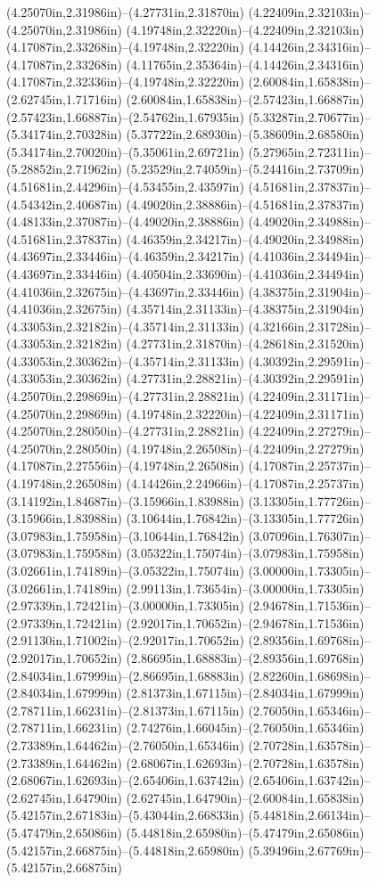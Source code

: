 (4.25070in,2.31986in)--(4.27731in,2.31870in) (4.22409in,2.32103in)--(4.25070in,2.31986in) (4.19748in,2.32220in)--(4.22409in,2.32103in) (4.17087in,2.33268in)--(4.19748in,2.32220in) (4.14426in,2.34316in)--(4.17087in,2.33268in) (4.11765in,2.35364in)--(4.14426in,2.34316in) (4.17087in,2.32336in)--(4.19748in,2.32220in) (2.60084in,1.65838in)--(2.62745in,1.71716in) (2.60084in,1.65838in)--(2.57423in,1.66887in) (2.57423in,1.66887in)--(2.54762in,1.67935in) (5.33287in,2.70677in)--(5.34174in,2.70328in) (5.37722in,2.68930in)--(5.38609in,2.68580in) (5.34174in,2.70020in)--(5.35061in,2.69721in) (5.27965in,2.72311in)--(5.28852in,2.71962in) (5.23529in,2.74059in)--(5.24416in,2.73709in) (4.51681in,2.44296in)--(4.53455in,2.43597in) (4.51681in,2.37837in)--(4.54342in,2.40687in) (4.49020in,2.38886in)--(4.51681in,2.37837in) (4.48133in,2.37087in)--(4.49020in,2.38886in) (4.49020in,2.34988in)--(4.51681in,2.37837in) (4.46359in,2.34217in)--(4.49020in,2.34988in) (4.43697in,2.33446in)--(4.46359in,2.34217in) (4.41036in,2.34494in)--(4.43697in,2.33446in) (4.40504in,2.33690in)--(4.41036in,2.34494in) (4.41036in,2.32675in)--(4.43697in,2.33446in) (4.38375in,2.31904in)--(4.41036in,2.32675in) (4.35714in,2.31133in)--(4.38375in,2.31904in) (4.33053in,2.32182in)--(4.35714in,2.31133in) (4.32166in,2.31728in)--(4.33053in,2.32182in) (4.27731in,2.31870in)--(4.28618in,2.31520in) (4.33053in,2.30362in)--(4.35714in,2.31133in) (4.30392in,2.29591in)--(4.33053in,2.30362in) (4.27731in,2.28821in)--(4.30392in,2.29591in) (4.25070in,2.29869in)--(4.27731in,2.28821in) (4.22409in,2.31171in)--(4.25070in,2.29869in) (4.19748in,2.32220in)--(4.22409in,2.31171in) (4.25070in,2.28050in)--(4.27731in,2.28821in) (4.22409in,2.27279in)--(4.25070in,2.28050in) (4.19748in,2.26508in)--(4.22409in,2.27279in) (4.17087in,2.27556in)--(4.19748in,2.26508in) (4.17087in,2.25737in)--(4.19748in,2.26508in) (4.14426in,2.24966in)--(4.17087in,2.25737in) (3.14192in,1.84687in)--(3.15966in,1.83988in) (3.13305in,1.77726in)--(3.15966in,1.83988in) (3.10644in,1.76842in)--(3.13305in,1.77726in) (3.07983in,1.75958in)--(3.10644in,1.76842in) (3.07096in,1.76307in)--(3.07983in,1.75958in) (3.05322in,1.75074in)--(3.07983in,1.75958in) (3.02661in,1.74189in)--(3.05322in,1.75074in) (3.00000in,1.73305in)--(3.02661in,1.74189in) (2.99113in,1.73654in)--(3.00000in,1.73305in) (2.97339in,1.72421in)--(3.00000in,1.73305in) (2.94678in,1.71536in)--(2.97339in,1.72421in) (2.92017in,1.70652in)--(2.94678in,1.71536in) (2.91130in,1.71002in)--(2.92017in,1.70652in) (2.89356in,1.69768in)--(2.92017in,1.70652in) (2.86695in,1.68883in)--(2.89356in,1.69768in) (2.84034in,1.67999in)--(2.86695in,1.68883in) (2.82260in,1.68698in)--(2.84034in,1.67999in) (2.81373in,1.67115in)--(2.84034in,1.67999in) (2.78711in,1.66231in)--(2.81373in,1.67115in) (2.76050in,1.65346in)--(2.78711in,1.66231in) (2.74276in,1.66045in)--(2.76050in,1.65346in) (2.73389in,1.64462in)--(2.76050in,1.65346in) (2.70728in,1.63578in)--(2.73389in,1.64462in) (2.68067in,1.62693in)--(2.70728in,1.63578in) (2.68067in,1.62693in)--(2.65406in,1.63742in) (2.65406in,1.63742in)--(2.62745in,1.64790in) (2.62745in,1.64790in)--(2.60084in,1.65838in) (5.42157in,2.67183in)--(5.43044in,2.66833in) (5.44818in,2.66134in)--(5.47479in,2.65086in) (5.44818in,2.65980in)--(5.47479in,2.65086in) (5.42157in,2.66875in)--(5.44818in,2.65980in) (5.39496in,2.67769in)--(5.42157in,2.66875in) 